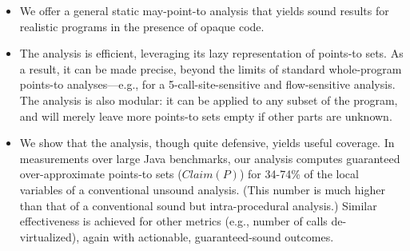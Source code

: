 \begin{itemize}
\item We offer a general static may-point-to analysis that
  yields sound results for realistic programs in the presence of
  opaque code.


\item The analysis is efficient, leveraging its lazy representation of
  points-to sets. As a result, it can be made precise, beyond the
  limits of standard whole-program points-to analyses---e.g., for a
  5-call-site-sensitive and flow-sensitive analysis. The analysis is
  also modular: it can be applied to any subset of the program, and
  will merely leave more points-to sets empty if other parts are
  unknown.
  
\item We show that the analysis, though quite defensive, yields useful
  coverage. In measurements over large Java benchmarks, our
  analysis computes guaranteed over-approximate points-to sets (\(Claim(P)\)) for
  34-74\% of the local variables of a conventional unsound analysis.
  (This number is much higher than that of a
  conventional sound but intra-procedural analysis.)  Similar
  effectiveness is achieved for other metrics (e.g., number of calls
  de-virtualized), again with actionable, guaranteed-sound
  outcomes.



\end{itemize}



